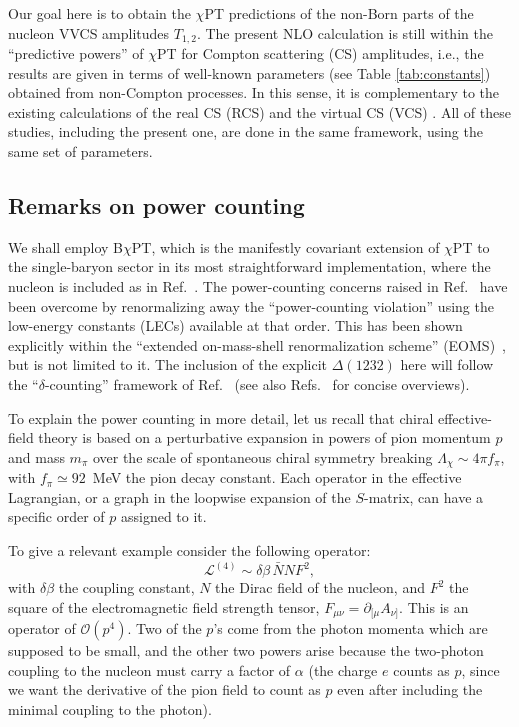 \documentclass[12pt,preprint,tightenlines,
showpacs,preprintnumbers,amsmath,amssymb,
a4paper,nofootinbib]{revtex4-2}
\def\beq{\begin{equation}}
\def\eeq{\end{equation}}
\def\seclab#1{\label{sec:#1}}
\def\al{\alpha}
\def\be{\beta}
\def\de{\delta} \def\De{\Delta}
\def\pa{\partial}
\def\pa{\partial}
\def\lag{{\mathcal L}}
\begin{document}
Our goal here is to obtain the $\chi$PT predictions of
the non-Born parts of the nucleon VVCS amplitudes $T_{1,2}$.
The present NLO calculation is still within the ``predictive powers'' of $\chi$PT for Compton scattering (CS) amplitudes, i.e., 
the results are given in terms of well-known parameters
(see Table \ref{tab:constants}) obtained from non-Compton processes.
In this sense, it is complementary to the existing calculations of the real CS (RCS) \cite{Lensky:2009uv,Lensky:2015awa}
and the virtual CS (VCS) \cite{Lensky:2016nui}. All of these studies, 
including the present one, are done in the same framework, using the same set of parameters. 




\subsection{Remarks on power counting} \seclab{PowerCounting}

  We shall employ B$\chi$PT, which is the manifestly covariant extension of $\chi$PT to the single-baryon sector in its most straightforward implementation, where
the nucleon is included as in Ref.~\cite{Gasser:1987rb}. The power-counting concerns  
raised in Ref.~\cite{Gasser:1987rb} have been overcome by renormalizing away the ``power-counting
violation'' using the low-energy constants (LECs)
available at that order.
 This has been shown explicitly within the  ``extended on-mass-shell renormalization scheme'' (EOMS)~\cite{Fuchs:2003qc}, 
 but is not limited to it. 
 The inclusion of the explicit $\De(1232)$ here will follow
 the ``$\de$-counting'' framework 
of Ref.~\cite{Pascalutsa:2003aa} (see also Refs.~\cite{Pascalutsa:2006up,Geng:2013xn} for concise overviews).

To explain the power counting in more detail,  
let us recall that  chiral effective-field theory is based on 
a perturbative expansion in powers of pion momentum $p$ and mass $m_\pi$ over the scale of spontaneous chiral symmetry breaking ${\Lambda_\chi\sim 4\pi f_\pi}$, with
$f_\pi\simeq 92$~MeV the pion decay constant. Each operator in the effective Lagrangian, or a
graph in the loopwise expansion of the $S$-matrix, can have a specific order of
$p$ assigned to it.

To give a relevant example consider the following operator: 
\beq
\lag^{(4)} \sim \de \be \, \bar N N F^2,
\eeq
with $\de \be$ the coupling constant, $N$ the Dirac field
of the nucleon, and $F^2$ the square of the electromagnetic field strength tensor, $F_{\mu\nu}=\pa_{[\mu}A_{\nu]}$. This is an operator of $\mathcal{O}(p^4)$. Two of the $p$'s come from the
photon momenta which are supposed to be small, and the other two powers arise because the two-photon
coupling to the nucleon must carry a factor of $\al$ (the charge $e$ counts as $p$, since we want
the derivative of the pion field to count as $p$ even after including the minimal coupling to the photon).
\end{document}
